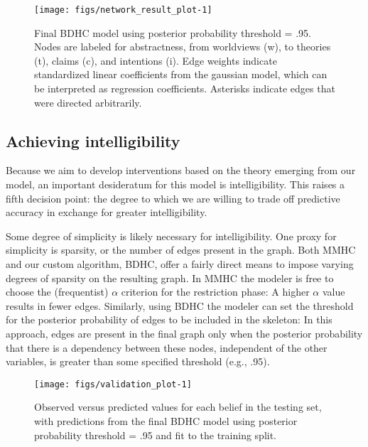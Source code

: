 \documentclass[10pt, letterpaper]{article}
\newenvironment{CodeChunk}{}{}
\begin{document}
\begin{CodeChunk}
\begin{figure*}[h]

{\centering \texttt{[image: figs/network\_result\_plot-1]} 

}

\caption[Final BDHC model using posterior probability threshold = .95]{Final BDHC model using posterior probability threshold = .95. Nodes are labeled for abstractness, from worldviews (w), to theories (t), claims (c), and intentions (i). Edge weights indicate standardized linear coefficients from the gaussian model, which can be interpreted as regression coefficients. Asterisks indicate edges that were directed arbitrarily.}\label{fig:network_result_plot}
\end{figure*}
\end{CodeChunk}

\subsection{Achieving intelligibility}\label{achieving-intelligibility}

Because we aim to develop interventions based on the theory emerging
from our model, an important desideratum for this model is
intelligibility. This raises a fifth decision point: the degree to which
we are willing to trade off predictive accuracy in exchange for greater
intelligibility.

Some degree of simplicity is likely necessary for intelligibility. One
proxy for simplicity is sparsity, or the number of edges present in the
graph. Both MMHC and our custom algorithm, BDHC, offer a fairly direct
means to impose varying degrees of sparsity on the resulting graph. In
MMHC the modeler is free to choose the (frequentist) \(\alpha\)
criterion for the restriction phase: A higher \(\alpha\) value results
in fewer edges. Similarly, using BDHC the modeler can set the threshold
for the posterior probability of edges to be included in the skeleton:
In this approach, edges are present in the final graph only when the
posterior probability that there is a dependency between these nodes,
independent of the other variables, is greater than some specified
threshold (e.g., .95).

\begin{CodeChunk}
\begin{figure*}[h]

{\centering \texttt{[image: figs/validation\_plot-1]} 

}

\caption[Observed versus predicted values for each belief in the testing set, with predictions from the final BDHC model using posterior probability threshold = .95 and fit to the training split]{Observed versus predicted values for each belief in the testing set, with predictions from the final BDHC model using posterior probability threshold = .95 and fit to the training split.}\label{fig:validation_plot}
\end{figure*}
\end{CodeChunk}
\end{document}
